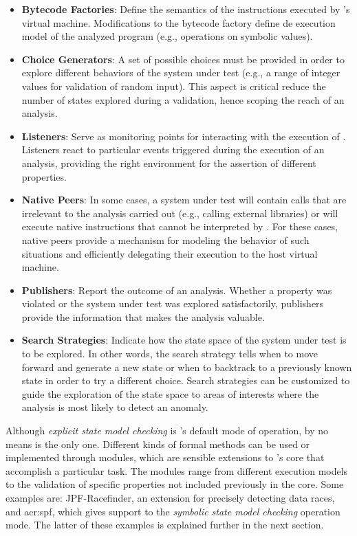 \begin{itemize}
	\item \textbf{Bytecode Factories}: Define the semantics of the instructions executed by \jpf{}'s virtual machine. Modifications to the bytecode factory define de execution model of the analyzed program (e.g., operations on symbolic values).
	
	\item \textbf{Choice Generators}: A set of possible choices must be provided in order to explore different behaviors of the system under test (e.g., a range of integer values for validation of random input). This aspect is critical reduce the number of states explored during a validation, hence scoping the reach of an analysis.
	
	\item \textbf{Listeners}: Serve as monitoring points for interacting with the execution of \jpf{}. Listeners react to particular events triggered during the execution of an analysis, providing the right environment for the assertion of different properties.
	
	\item \textbf{Native Peers}: In some cases, a system under test will contain calls that are irrelevant to the analysis carried out (e.g., calling external libraries) or will execute native instructions that cannot be interpreted by \jpf{}. For these cases, native peers provide a mechanism for modeling the behavior of such situations and efficiently delegating their execution to the host virtual machine.
	
	\item \textbf{Publishers}: Report the outcome of an analysis. Whether a property was violated or the system under test was explored satisfactorily, publishers provide the information that makes the analysis valuable.   
	
	\item \textbf{Search Strategies}: Indicate how the state space of the system under test is to be explored. In other words, the search strategy tells \jpf{} when to move forward and generate a new state or when to backtrack to a previously known state in order to try a different choice. Search strategies can be customized to guide the exploration of the state space to areas of interests where the analysis is most likely to detect an anomaly. 
\end{itemize}

Although \textit{explicit state model checking} is \jpf{}'s default mode of operation, by no means is the only one. Different kinds of formal methods can be used or implemented through modules, which are sensible extensions to \jpf{}'s core that accomplish a particular task. The modules range from different execution models to the validation of specific properties not included previously in the core. Some examples are: JPF-Racefinder, an extension for precisely detecting data races, and \acrfull{acr:spf}, which gives support to the \textit{symbolic state model checking} operation mode. The latter of these examples is explained further in the next section.

